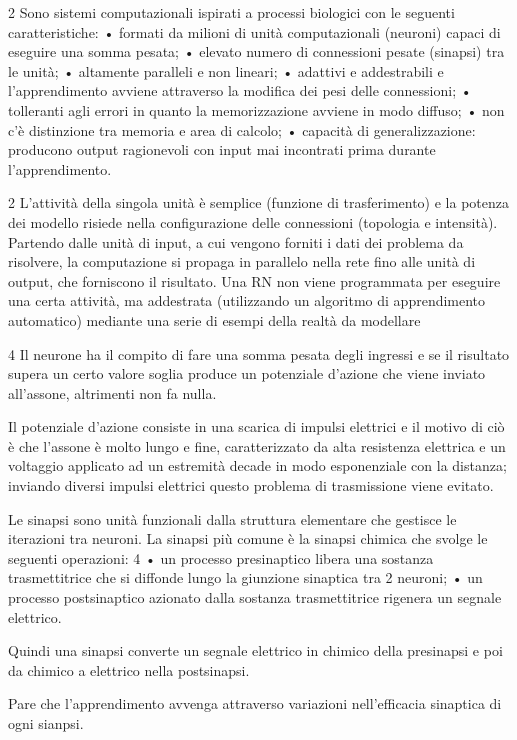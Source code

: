 \documentclass[12pt,a4paper,oneside]{book}
\begin{document}
		2 Sono sistemi computazionali ispirati a processi biologici con le seguenti caratteristiche:  • formati da milioni di unità computazionali (neuroni) capaci di eseguire una somma pesata;  • elevato numero di connessioni pesate (sinapsi) tra le unità;  • altamente paralleli e non lineari;  • adattivi e addestrabili e l'apprendimento avviene attraverso la modifica dei pesi delle connessioni;  • tolleranti agli errori in quanto la memorizzazione avviene in modo diffuso;  • non c'è distinzione tra memoria e area di calcolo;  • capacità di generalizzazione: producono output ragionevoli con input mai incontrati prima durante l'apprendimento. 
		
		2 L'attività della singola unità è semplice (funzione di trasferimento) e la potenza dei modello risiede nella configurazione delle connessioni (topologia e intensità).
		Partendo dalle unità di input, a cui vengono forniti i dati dei problema da risolvere, la computazione si propaga in parallelo nella rete fino alle unità di output, che forniscono il risultato.
		Una RN non viene programmata per eseguire una certa attività, ma addestrata (utilizzando un algoritmo di apprendimento automatico) mediante una serie di esempi della realtà da modellare
		
		
		4 Il neurone ha il compito di fare una somma pesata degli ingressi e se il risultato supera un certo valore soglia produce un potenziale d'azione che viene inviato all'assone, altrimenti non fa nulla. 
		
		Il potenziale d'azione consiste in una scarica di impulsi elettrici e il motivo di ciò è che l'assone è molto lungo e fine, caratterizzato da alta resistenza elettrica e un voltaggio applicato ad un estremità decade in modo esponenziale con la distanza; inviando diversi impulsi elettrici questo problema di trasmissione viene evitato. 
		
		Le sinapsi sono unità funzionali dalla struttura elementare che gestisce le iterazioni tra neuroni. La sinapsi più comune è la sinapsi chimica che svolge le seguenti operazioni: 
		4
		• un processo presinaptico libera una sostanza trasmettitrice che si diffonde lungo la giunzione sinaptica tra 2 neuroni; • un processo postsinaptico azionato dalla sostanza trasmettitrice rigenera un segnale elettrico. 
		
		Quindi una sinapsi converte un segnale elettrico in chimico della presinapsi e poi da chimico a elettrico nella postsinapsi. 
		
		
		Pare che l'apprendimento avvenga attraverso variazioni nell'efficacia sinaptica di ogni sianpsi. 
\end{document}
